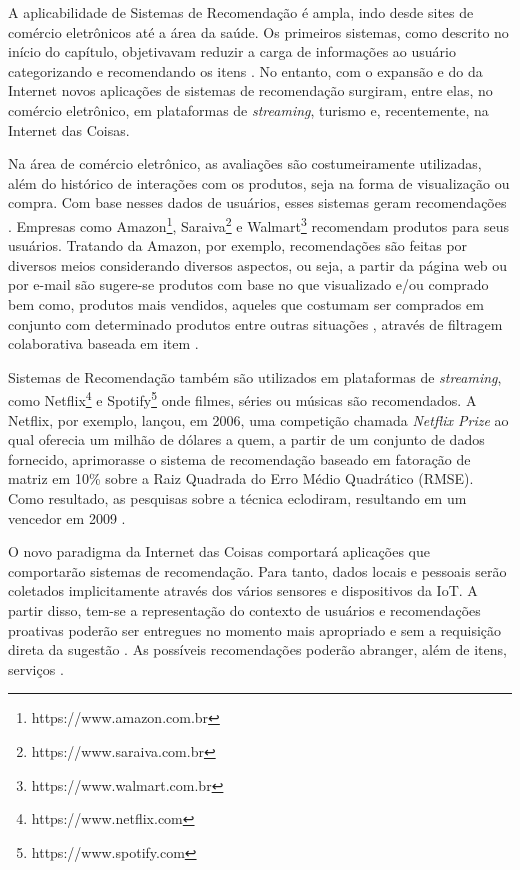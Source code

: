 
A aplicabilidade de Sistemas de Recomendação é ampla, indo desde sites de comércio eletrônicos até a área da saúde. Os primeiros sistemas, como descrito no início do capítulo, objetivavam reduzir a carga de informações ao usuário categorizando e recomendando os itens \cite{Goldberg1992, Resnick1994}. No entanto, com o expansão e do da Internet novos aplicações de sistemas de recomendação surgiram, entre elas, no comércio eletrônico, em plataformas de \textit{streaming}, turismo e, recentemente, na Internet das Coisas. 

Na área de comércio eletrônico, as avaliações são costumeiramente utilizadas, além do histórico de interações com os produtos, seja na forma de visualização ou compra. Com base nesses dados de usuários, esses sistemas geram recomendações  \cite{Lu2015}. Empresas como Amazon\textsuperscript{\textregistered}\footnote{https://www.amazon.com.br}, Saraiva\textsuperscript{\textregistered}\footnote{https://www.saraiva.com.br} e Walmart\textsuperscript{\textregistered}\footnote{https://www.walmart.com.br} recomendam produtos para seus usuários. Tratando da Amazon, por exemplo, recomendações são feitas por diversos meios considerando diversos aspectos, ou seja, a partir da página web ou por e-mail são sugere-se produtos com base no que visualizado e/ou comprado bem como, produtos mais vendidos, aqueles que costumam ser comprados em conjunto com determinado produtos entre outras situações \cite{Krawiec2016}, através de filtragem colaborativa baseada em item \cite{Smith2017}.


Sistemas de Recomendação também são utilizados em plataformas de \textit{streaming}, como Netflix\textsuperscript{\textregistered}\footnote{https://www.netflix.com} e Spotify\textsuperscript{\textregistered}\footnote{https://www.spotify.com} onde filmes, séries ou músicas são recomendados. A Netflix, por exemplo, lançou, em 2006, uma competição chamada \textit{Netflix Prize} ao qual oferecia um milhão de dólares a quem, a partir de um conjunto de dados fornecido, aprimorasse o sistema de recomendação baseado em fatoração de matriz em 10\% sobre a Raiz Quadrada do Erro Médio Quadrático (RMSE). Como resultado, as pesquisas sobre a técnica eclodiram, resultando em um vencedor em 2009 \cite{Jannach2016}.


O novo paradigma da Internet das Coisas comportará aplicações que comportarão  sistemas de recomendação. Para tanto, dados locais e pessoais serão coletados implicitamente através dos vários sensores e dispositivos da IoT. A partir disso, tem-se a representação do contexto de usuários e recomendações proativas poderão ser entregues no momento mais apropriado e sem a requisição direta da sugestão \cite{Salman2015}. As possíveis recomendações poderão abranger, além de itens, serviços \cite {Mashal2015}.



